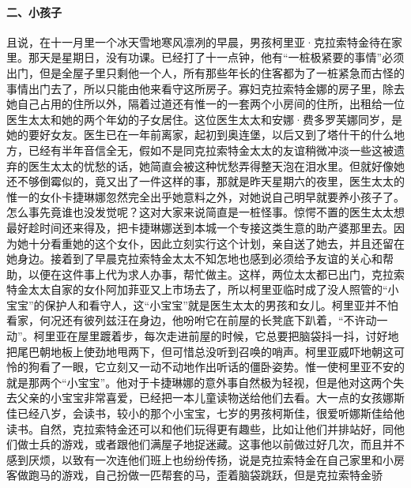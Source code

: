 \paragraph*{二、小孩子}
\par 且说，在十一月里一个冰天雪地寒风凛冽的早晨，男孩柯里亚·克拉索特金待在家里。那天是星期日，没有功课。已经打了十一点钟，他有“一桩极紧要的事情”必须出门，但是全屋子里只剩他一个人，所有那些年长的住客都为了一桩紧急而古怪的事情出门去了，所以只能由他来看守这所房子。寡妇克拉索特金娜的房子里，除去她自己占用的住所以外，隔着过道还有惟一的一套两个小房间的住所，出租给一位医生太太和她的两个年幼的子女居住。这位医生太太和安娜·费多罗芙娜同岁，是她的要好女友。医生已在一年前离家，起初到奥连堡，以后又到了塔什干的什么地方，已经有半年音信全无，假如不是同克拉索特金太太的友谊稍微冲淡一些这被遗弃的医生太太的忧愁的话，她简直会被这种忧愁弄得整天泡在泪水里。但就好像她还不够倒霉似的，竟又出了一件这样的事，那就是昨天星期六的夜里，医生太太的惟一的女仆卡捷琳娜忽然完全出乎她意料之外，对她说自己明早就要养小孩子了。怎么事先竟谁也没发觉呢？这对大家来说简直是一桩怪事。惊愕不置的医生太太想最好趁时间还来得及，把卡捷琳娜送到本城一个专接这类生意的助产婆那里去。因为她十分看重她的这个女仆，因此立刻实行这个计划，亲自送了她去，并且还留在她身边。接着到了早晨克拉索特金太太不知怎地也感到必须给予友谊的关心和帮助，以便在这件事上代为求人办事，帮忙做主。这样，两位太太都已出门，克拉索特金太太自家的女仆阿加菲亚又上市场去了，所以柯里亚临时成了没人照管的“小宝宝”的保护人和看守人，这“小宝宝”就是医生太太的男孩和女儿。柯里亚并不怕看家，何况还有彼列兹汪在身边，他吩咐它在前屋的长凳底下趴着，“不许动一动”。柯里亚在屋里踱着步，每次走进前屋的时候，它总要把脑袋抖一抖，讨好地把尾巴朝地板上使劲地甩两下，但可惜总没听到召唤的哨声。柯里亚威吓地朝这可怜的狗看了一眼，它立刻又一动不动地作出听话的僵卧姿势。惟一使柯里亚不安的就是那两个“小宝宝”。他对于卡捷琳娜的意外事自然极为轻视，但是他对这两个失去父亲的小宝宝非常喜爱，已经把一本儿童读物送给他们去看。大一点的女孩娜斯佳已经八岁，会读书，较小的那个小宝宝，七岁的男孩柯斯佳，很爱听娜斯佳给他读书。自然，克拉索特金还可以和他们玩得更有趣些，比如让他们并排站好，同他们做士兵的游戏，或者跟他们满屋子地捉迷藏。这事他以前做过好几次，而且并不感到厌烦，以致有一次连他们班上也纷纷传扬，说是克拉索特金在自己家里和小房客做跑马的游戏，自己扮做一匹帮套的马，歪着脑袋跳跃，但是克拉索特金骄